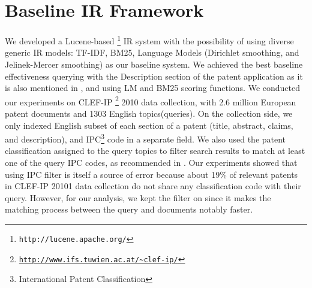 \documentclass{sig-alternate}
\begin{document}
\section{Baseline IR Framework}
We developed a Lucene-based%
\footnote{\texttt{http://lucene.apache.org/}%
} IR system with the possibility of using diverse generic IR models: TF-IDF, BM25, Language Models (Dirichlet smoothing, and Jelinek-Mercer smoothing) as our baseline system. We achieved the best baseline effectiveness querying with the Description section of the patent application as it is also mentioned in \cite{xue2009transforming}, and using LM and BM25 scoring functions. We conducted our experiments on CLEF-IP%
\footnote{\texttt{\url{http://www.ifs.tuwien.ac.at/~clef-ip/}}}%
 2010 data collection, with 2.6 million European patent documents and 1303 English topics(queries). On the collection side, we only indexed English subset of each section of a patent (title, abstract, claims, and description), and IPC\footnote{International Patent Classification}%
  code in a separate field. We also used the patent classification assigned to the query topics to filter search results to match at least one of the query IPC codes, as recommended in \cite{lopez2010patatras}. Our experiments showed that using IPC filter is itself a source of error because about 19\% of relevant patents in CLEF-IP 20101 data collection do not share any classification code with their query. However, for our analysis, we kept the filter on since it makes the matching process between the query and documents notably faster.
\end{document}
